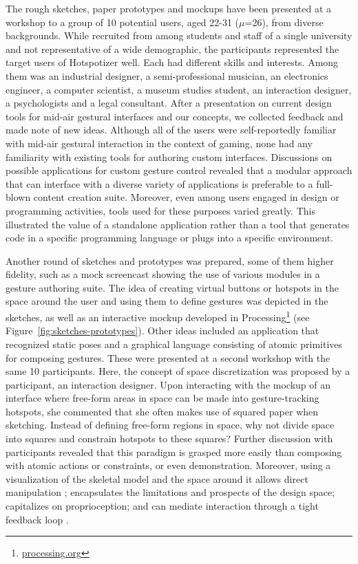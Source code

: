 The rough sketches, paper prototypes and mockups have been presented at a workshop to a group of 10 potential users, aged 22-31 ($\mu$=26), from diverse backgrounds. While recruited from among students and staff of a single university and not representative of a wide demographic, the participants represented the target users of Hotspotizer well. Each had different skills and interests. Among them was an industrial designer, a semi-professional musician, an electronics engineer, a computer scientist, a museum studies student, an interaction designer, a psychologists and a legal consultant. After a presentation on current design tools for mid-air gestural interfaces and our concepts, we collected feedback and made note of new ideas. Although all of the users were self-reportedly familiar with mid-air gestural interaction in the context of gaming, none had any familiarity with existing tools for authoring custom interfaces. Discussions on possible applications for custom gesture control revealed that a modular approach that can interface with a diverse variety of applications is preferable to a full-blown content creation suite. Moreover, even among users engaged in design or programming activities, tools used for these purposes varied greatly. This illustrated the value of a standalone application rather than a tool that generates code in a specific programming language or plugs into a specific environment.

Another round of sketches and prototypes was prepared, some of them higher fidelity, such as a mock screencast showing the use of various modules in a gesture authoring suite. The idea of creating virtual buttons or hotspots in the space around the user and using them to define gestures was depicted in the sketches, as well as an interactive mockup developed in Processing\footnote{\href{http://processing.org/}{processing.org}} (see Figure~\ref{fig:sketches-prototypes}). Other ideas included an application that recognized static poses and a graphical language consisting of atomic primitives for composing gestures. These were presented at a second workshop with the same 10 participants. Here, the concept of space discretization was proposed by a participant, an interaction designer. Upon interacting with the mockup of an interface where free-form areas in space can be made into gesture-tracking hotspots, she commented that she often makes use of squared paper when sketching. Instead of defining free-form regions in space, why not divide space into squares and constrain hotspots to these squares? Further discussion with participants revealed that this paradigm is grasped more easily than composing with atomic actions or constraints, or even demonstration. Moreover, using a visualization of the skeletal model and the space around it allows direct manipulation \parencite{Hutchins:1985}; encapsulates the limitations and prospects of the design space; capitalizes on proprioception; and can mediate interaction through a tight feedback loop \parencite{Wilson:2012}.

